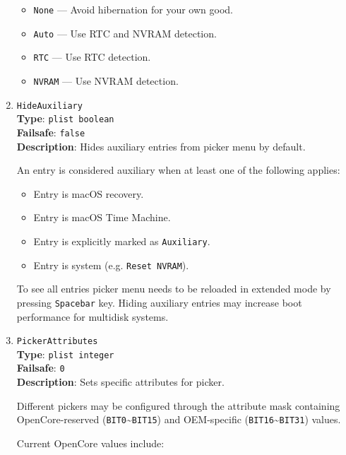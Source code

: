 \documentclass[]{article}
\providecommand{\tightlist}{%
  \setlength{\itemsep}{0pt}\setlength{\parskip}{0pt}}
\begin{document}
\begin{enumerate}
  \begin{itemize}
  \tightlist
    \item \texttt{None} --- Avoid hibernation for your own good.
    \item \texttt{Auto} --- Use RTC and NVRAM detection.
    \item \texttt{RTC} --- Use RTC detection.
    \item \texttt{NVRAM} --- Use NVRAM detection.
  \end{itemize}

\item
  \texttt{HideAuxiliary}\\
  \textbf{Type}: \texttt{plist\ boolean}\\
  \textbf{Failsafe}: \texttt{false}\\
  \textbf{Description}: Hides auxiliary entries from picker menu by default.

  An entry is considered auxiliary when at least one of the following applies:

  \begin{itemize}
  \tightlist
    \item Entry is macOS recovery.
    \item Entry is macOS Time Machine.
    \item Entry is explicitly marked as \texttt{Auxiliary}.
    \item Entry is system (e.g. \texttt{Reset NVRAM}).
  \end{itemize}

  To see all entries picker menu needs to be reloaded in extended mode by pressing
  \texttt{Spacebar} key. Hiding auxiliary entries may increase boot performance
  for multidisk systems.

\item
  \texttt{PickerAttributes}\\
  \textbf{Type}: \texttt{plist\ integer}\\
  \textbf{Failsafe}: \texttt{0}\\
  \textbf{Description}: Sets specific attributes for picker.

  Different pickers may be configured through the attribute mask containing
  OpenCore-reserved (\texttt{BIT0}\textasciitilde\texttt{BIT15}) and OEM-specific
  (\texttt{BIT16}\textasciitilde\texttt{BIT31}) values.

  Current OpenCore values include:


\end{enumerate}
\end{document}
